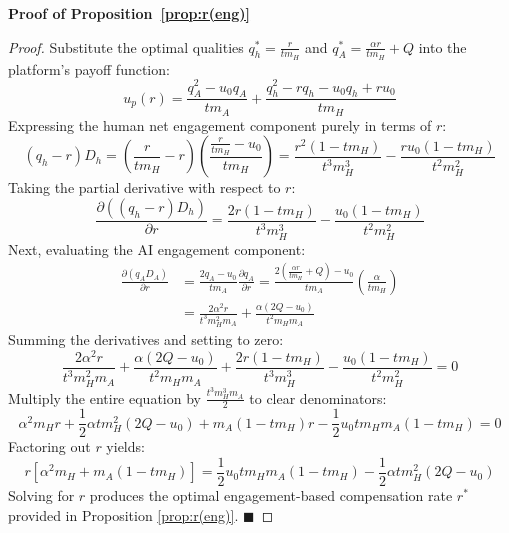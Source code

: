 \documentclass[mnsc,nonblindrev]{informs3_NoOR}
\begin{document}
\noindent\textbf{Proof of Proposition~\ref{prop:r(eng)}}
\begin{proof}
Substitute the optimal qualities $q_{h}^{*} = \frac{r}{tm_{H}}$ and $q_{A}^{*} = \frac{\alpha r}{tm_{H}} + Q$ into the platform's payoff function:
\begin{equation}
u_{p}(r) = \frac{q_{A}^{2} - u_{0}q_{A}}{tm_{A}} + \frac{q_{h}^{2} - rq_{h} - u_{0}q_{h} + ru_{0}}{tm_{H}}
\end{equation}
Expressing the human net engagement component purely in terms of $r$:
\begin{equation}
(q_{h} - r)D_{h} = \left( \frac{r}{tm_{H}} - r \right) \left( \frac{\frac{r}{tm_{H}} - u_{0}}{tm_{H}} \right) = \frac{r^{2}(1 - tm_{H})}{t^{3}m_{H}^{3}} - \frac{ru_{0}(1 - tm_{H})}{t^{2}m_{H}^{2}}
\end{equation}
Taking the partial derivative with respect to $r$:
\begin{equation}
\frac{\partial ((q_{h} - r)D_{h})}{\partial r} = \frac{2r(1 - tm_{H})}{t^{3}m_{H}^{3}} - \frac{u_{0}(1 - tm_{H})}{t^{2}m_{H}^{2}}
\end{equation}
Next, evaluating the AI engagement component:
\begin{align}
\frac{\partial (q_{A}D_{A})}{\partial r} &= \frac{2q_{A} - u_{0}}{tm_{A}} \frac{\partial q_{A}}{\partial r} = \frac{2\left(\frac{\alpha r}{tm_{H}} + Q\right) - u_{0}}{tm_{A}} \left( \frac{\alpha}{tm_{H}} \right) \nonumber \\
&= \frac{2\alpha^{2}r}{t^{3}m_{H}^{2}m_{A}} + \frac{\alpha(2Q - u_{0})}{t^{2}m_{H}m_{A}}
\end{align}
Summing the derivatives and setting to zero:
\begin{equation}
\frac{2\alpha^{2}r}{t^{3}m_{H}^{2}m_{A}} + \frac{\alpha(2Q - u_{0})}{t^{2}m_{H}m_{A}} + \frac{2r(1 - tm_{H})}{t^{3}m_{H}^{3}} - \frac{u_{0}(1 - tm_{H})}{t^{2}m_{H}^{2}} = 0
\end{equation}
Multiply the entire equation by $\frac{t^{3}m_{H}^{3}m_{A}}{2}$ to clear denominators:
\begin{equation}
\alpha^{2}m_{H}r + \frac{1}{2}\alpha tm_{H}^{2}(2Q - u_{0}) + m_{A}(1 - tm_{H})r - \frac{1}{2}u_{0}tm_{H}m_{A}(1 - tm_{H}) = 0
\end{equation}
Factoring out $r$ yields:
\begin{equation}
r \left[ \alpha^{2}m_{H} + m_{A}(1 - tm_{H}) \right] = \frac{1}{2}u_{0}tm_{H}m_{A}(1 - tm_{H}) - \frac{1}{2}\alpha tm_{H}^{2}(2Q - u_{0})
\end{equation}
Solving for $r$ produces the optimal engagement-based compensation rate $r^{*}$ provided in Proposition \ref{prop:r(eng)}. 
\hfill $\blacksquare$
\end{proof}
\end{document}
